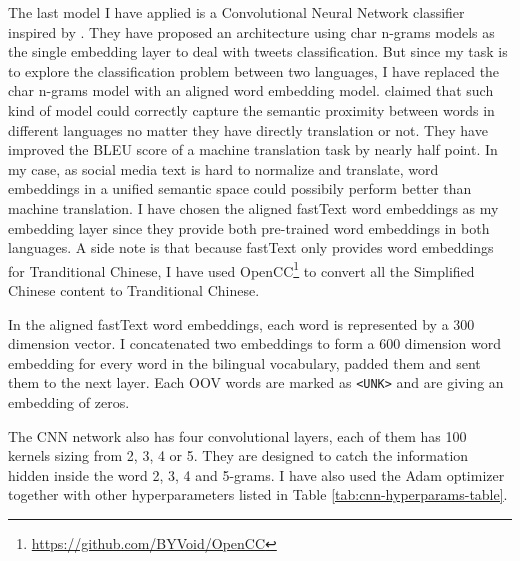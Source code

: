 \documentclass[11pt,a4paper]{article}
\begin{document}
The last model I have applied is a Convolutional Neural Network classifier inspired by \citet{shrestha2017convolutional}. They have proposed an architecture using char n-grams models as the single embedding layer to deal with tweets classification. But since my task is to explore the classification problem between two languages, I have replaced the char n-grams model with an aligned word embedding model. \citet{zou2013bilingual} claimed that such kind of model could correctly capture the semantic proximity between words in different languages no matter they have directly translation or not. They have improved the BLEU score of a machine translation task by nearly half point. In my case, as social media text is hard to normalize and translate, word embeddings in a unified semantic space could possibily perform better than machine translation. I have chosen the aligned fastText word embeddings \cite{bojanowski2017enriching} \cite{joulin2018loss} as my embedding layer since they provide both pre-trained word embeddings in both languages. A side note is that because fastText only provides word embeddings for Tranditional Chinese, I have used OpenCC\footnote{\url{https://github.com/BYVoid/OpenCC}} to convert all the Simplified Chinese content to Tranditional Chinese.

In the aligned fastText word embeddings, each word is represented by a 300 dimension vector. I concatenated two embeddings to form a 600 dimension word embedding for every word in the bilingual vocabulary, padded them and sent them to the next layer. Each OOV words are marked as \verb|<UNK>| and are giving an embedding of zeros.

The CNN network also has four convolutional layers, each of them has 100 kernels sizing from 2, 3, 4 or 5. They are designed to catch the information hidden inside the word 2, 3, 4 and 5-grams. I have also used the Adam optimizer \cite{kingma2014adam} together with other hyperparameters listed in Table \ref{tab:cnn-hyperparams-table}.
\end{document}
